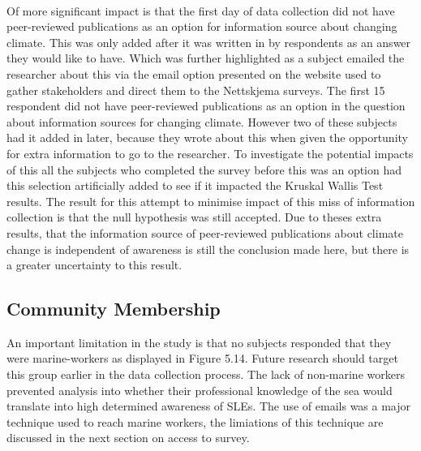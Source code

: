 \paragraph{}
Of more significant impact is that the first day of data collection did not have peer-reviewed publications as an option for information source about changing climate. This was only added after it was written in by respondents as an answer they would like to have. Which was further highlighted as a subject emailed the researcher about this via the email option presented on the website used to gather stakeholders and direct them to the Nettskjema surveys.  The first 15 respondent did not have peer-reviewed publications as an option in the question about information sources for changing climate. However two of these subjects had it added in later, because they wrote about this when given the opportunity for extra information to go to the researcher. To investigate the potential impacts of this all the subjects who completed the survey before this was an option had this selection artificially added to see if it impacted the Kruskal Wallis Test results. The result for this attempt to minimise impact of this miss of information collection is that the null hypothesis was still accepted. Due to theses extra results, that the information source of peer-reviewed publications about climate change is independent of awareness is still the conclusion made here, but there is a greater uncertainty to this result.
\paragraph{}


\subsection{Community Membership}
An important limitation in the study is that no subjects responded that they were marine-workers as displayed in Figure 5.14. Future research should target this group earlier in the data collection process. The lack of non-marine workers prevented analysis into whether their professional knowledge of the sea would translate into high determined awareness of SLEs. The use of emails was a major technique used to reach marine workers, the limiations of this technique are discussed in the next section on access to survey. 

